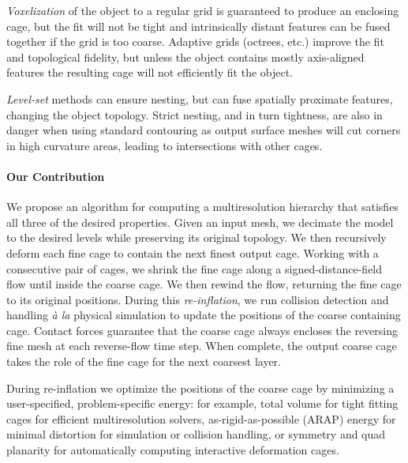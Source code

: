 \emph{Voxelization} of the object to a regular grid is guaranteed to produce
an enclosing cage, but the fit will not be tight and intrinsically distant
features can be fused together if the grid is too coarse. Adaptive grids
(octrees, etc.) improve the fit and topological fidelity, but unless the object
contains mostly axis-aligned features the resulting cage will not efficiently
fit the object.

\emph{Level-set} methods can ensure nesting, but can fuse spatially proximate
features, changing the object topology. Strict nesting, and in turn tightness,
are also in danger when using standard contouring as output surface meshes will
cut corners in high curvature areas, leading to intersections with other
cages.


\paragraph{Our Contribution}
%
We propose an algorithm for computing a
multiresolution hierarchy that satisfies all three of the desired properties.
%
Given an input mesh, we decimate the model to the desired levels while
preserving its original topology.
%
We then recursively deform each fine cage to contain the next finest output
cage.
%
Working with a consecutive pair of cages,
we shrink the fine cage along a signed-distance-field flow until inside the
coarse cage.
%
We then rewind the flow, returning the fine cage to its original positions.
During this \emph{re-inflation}, we run collision detection and handling
\emph{à la} physical simulation to update the positions of the coarse
containing cage. Contact forces guarantee that the coarse cage always encloses
the reversing fine mesh at each reverse-flow time step.
%
When complete, the output coarse cage takes the role of the fine cage for the
next coarsest layer.

During re-inflation we optimize the positions of the coarse cage by minimizing
a user-specified, problem-specific energy: for example, total volume for tight fitting
cages for efficient multiresolution solvers, as-rigid-as-possible (ARAP) energy for
minimal distortion for simulation or collision handling, or symmetry and quad
planarity for automatically computing interactive deformation cages.




